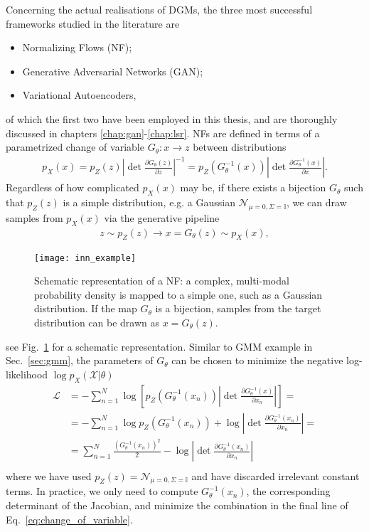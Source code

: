 Concerning the actual realisations of DGMs, the three most successful frameworks studied in the literature are
\begin{itemize}
\item
Normalizing Flows (NF);
\item
Generative Adversarial Networks (GAN);
\item
Variational Autoencoders,
\end{itemize}
of which the first two have been employed in this thesis, and are thoroughly discussed in chapters \ref{chap:gan}-\ref{chap:lsr}. NFs are defined in terms of a parametrized change of variable $G_{\theta}: x \rightarrow z$ between distributions
%
\begin{align}\label{eq:nf}
p_X(x) = p_Z(z) \left|\det \frac{\partial G_{\theta}(z)}{\partial z}\right|^{-1} = p_Z(G_{\theta}^{-1}(x)) \left|\det \frac{\partial G_{\theta}^{-1}(x)}{\partial x}\right|.
\end{align}
%
Regardless of how complicated $p_{X}(x)$ may be, if there exists a bijection $G_{\theta}$ such that $p_Z(z)$ is a simple distribution, e.g. a Gaussian $\mathcal{N}_{\mu=0, \Sigma=\mathbb{I}}$, we can draw samples from $p_{X}(x)$ via the generative pipeline
%
\begin{align}
z \sim p_Z(z) \longrightarrow x = G_{\theta}(z)  \sim p_{X}(x),
\end{align}
%
%
\begin{figure}[t]
\centering
\texttt{[image: inn\_example]}
\caption{Schematic representation of a NF: a complex, multi-modal probability density is mapped to a simple one, such as a Gaussian distribution. If the map $G_{\theta}$ is a bijection, samples from the target distribution can be drawn as $x = G_{\theta}(z)$.}
\label{fig:NF}
\end{figure}
%
see Fig.~\ref{fig:NF} for a schematic representation. Similar to GMM example in Sec.~\ref{sec:gmm}, the parameters of $G_{\theta}$ can be chosen to minimize the negative log-likelihood $\log p_{X}(\mathcal{X} | \theta)$ 
%
\begin{align}\label{eq:change_of_variable}
\mathcal{L} &= - \sum_{n=1}^N \log \left[ p_Z(G_{\theta}^{-1}(x_n)) \left|\det \frac{\partial G_{\theta}^{-1}(x)}{\partial x_n}\right| \right] = \\
&= -\sum_{n=1}^N \log p_Z(G_{\theta}^{-1}(x_n)) + \log \left|\det \frac{\partial G_{\theta}^{-1}(x_n)}{\partial x_n}\right| = \\
&= \sum_{n=1}^N \frac{(G_{\theta}^{-1}(x_n))^2}{2} - \log \left|\det \frac{\partial G_{\theta}^{-1}(x_n)}{\partial x_n}\right|\\
\end{align}
%
where we have used $p_{Z}(z) = \mathcal{N}_{\mu=0, \Sigma=\mathbb{I}}$ and have discarded irrelevant constant terms. 
In practice, we only need to compute $G_{\theta}^{-1}(x_n)$, the corresponding determinant of the Jacobian, and minimize the combination in the final line of Eq.~\ref{eq:change_of_variable}.

